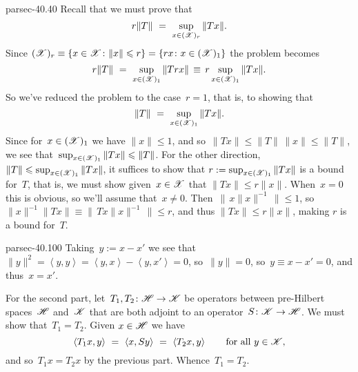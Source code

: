 \documentclass[b5page]{book}
\begin{document}
\begin{solution}{parsec-40.40}%
Recall that we must prove that
    \begin{equation*}
r\|T\|\ = \ \sup_{x\in (\mathscr{X})_r} \|Tx\|.
    \end{equation*}
Since $(\mathscr{X})_r \equiv \{x\in\mathscr{X}\colon \|x\|\leqslant r\}
    = \{rx\colon x\in (\mathscr{X})_1\}$
    the problem becomes
\begin{equation*}
r\|T\|\ = \ \sup_{x\in (\mathscr{X})_1} \|Trx\|
    \,\equiv\, r\sup_{x\in (\mathscr{X})_1} \|Tx\|.
\end{equation*}
So we've reduced the 
problem to the case~$r=1$, that is, to showing that
\begin{equation*}
    \|T\|\ = \ \sup_{x\in (\scrX)_1} \|Tx\|.
\end{equation*}
Since for~$x\in (\mathscr{X})_1$
we have $\|x\|\leq 1$,
and so~$\|Tx\|\leq \|T\|\,\|x\|\leq \|T\|$,
we see that~$\sup_{x\in (\mathscr{X})_1} \|Tx\|\leqslant \|T\|$.
For the other direction,
    $\|T\|\leqslant \sup_{x\in (\mathscr{X})_1} \|Tx\|$,
    it suffices to show that
 $r:=\sup_{x\in(\mathscr{X})_1} \|Tx\|$
is a bound for~$T$,
that is, we must show given~$x\in\mathscr{X}$
that $\|Tx\|\leq r\|x\|$.
When~$x=0$ this is obvious, so we'll assume that~$x\neq 0$.
Then~$\| \,x\|x\|^{-1}\,\|\leq 1$,
    so $\|x\|^{-1} \|Tx\|\equiv \|\,T x \|x\|^{-1}\, \| \leq r$,
    and thus $\|Tx\|\leq r\|x\|$,
    making $r$ is a bound for~$T$.
\end{solution}
\begin{solution}{parsec-40.100}%
Taking~$y:=x-x'$ we see that
$\|y\|^2 = \left<y,y\right>
= \left<y,x\right> - \left<y,x'\right> = 0$,
so~$\|y\|=0$,
so~$y\equiv x-x'=0$,
and thus~$x=x'$.

For the second part,
let~$T_1,T_2\colon \mathscr{H}\to\mathscr{K}$
be operators between pre-Hilbert spaces~$\mathscr{H}$
and~$\mathscr{K}$
that are both adjoint to an operator~$S\colon \mathscr{K}\to\mathscr{H}$.
We must show that~$T_1=T_2$.
Given $x\in\mathscr{H}$ we have
\begin{equation*}
\left<T_1x,y\right>
\ = \ 
\left<x,Sy\right>
\ = \ 
\left<T_2x,y\right>
\qquad 
    \text{for all~$y\in\scrK$,}
\end{equation*}
and so~$T_1x=T_2x$ by the previous part.
Whence~$T_1=T_2$.
\end{solution}
\end{document}
